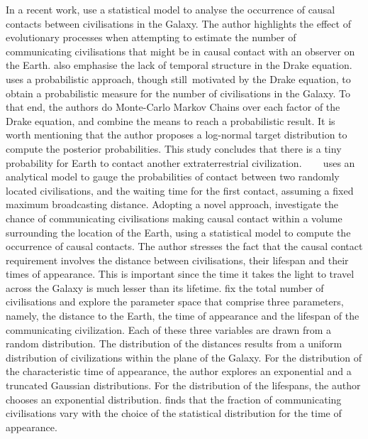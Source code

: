 \documentclass[crop]{CSLB}
\begin{document}
In a recent work, \citep{balbi_impact_2018} use a statistical model to
analyse the occurrence of causal contacts between civilisations in the
Galaxy.
%
The author highlights the effect of evolutionary processes when
attempting to estimate the number of communicating civilisations that
might be in causal contact with an observer on the Earth.
%
\citet{cirkovic_temporal_2004} also emphasise the lack of temporal
structure in the Drake equation.
%
\citet{bloetscher_using_2019} uses a probabilistic approach, though
still motivated by the Drake equation, to obtain a probabilistic
measure for the number of civilisations in the Galaxy.
%
To that end, the authors do Monte-Carlo Markov Chains over each factor
of the Drake equation, and combine the means to reach a probabilistic
result.
%
It is worth mentioning that the author proposes a log-normal target
distribution to compute the posterior probabilities.
%
This study concludes that there is a tiny probability for Earth to
contact another extraterrestrial civilization.    
%
\citet{smith_broadcasting_2009} uses an analytical model to gauge the
probabilities of contact between two randomly located civilisations,
and the waiting time for the first contact, assuming a fixed maximum
broadcasting distance.
% 
Adopting a novel approach, \citet{balbi_impact_2018} investigate the
chance of communicating civilisations making causal contact within a
volume surrounding the location of the Earth, using a statistical
model to compute the occurrence of causal contacts.
%
The author stresses the fact that the causal contact requirement
involves the distance between civilisations, their lifespan and their
times of appearance. This is important since the time it takes the
light to travel across the Galaxy is much lesser than its lifetime.
%
\citet{balbi_impact_2018} fix the total number of civilisations and
explore the parameter space that comprise three parameters, namely,
the distance to the Earth, the time of appearance and the lifespan of
the communicating civilization.
%
Each of these three variables are drawn from a random distribution.
The distribution of the distances results from a uniform distribution
of civilizations within the plane of the Galaxy.
%
For the distribution of the characteristic time of appearance, the
author explores an exponential and a truncated Gaussian distributions.
For the distribution of the lifespans, the author chooses an
exponential distribution.
%
\citet{balbi_impact_2018} finds that the fraction of communicating
civilisations vary with the choice of the statistical distribution for
the time of appearance. 
\end{document}
